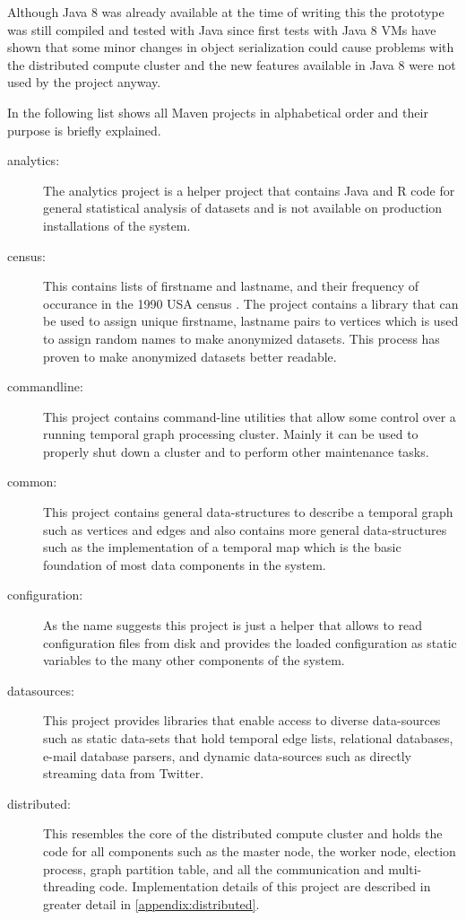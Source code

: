 Although Java 8 was already available at the time of writing this the prototype was still compiled and tested with Java \versionJava{} since first tests with Java 8 VMs have shown that some minor changes in object serialization could cause problems with the distributed compute cluster and the new features available in Java 8 were not used by the project anyway.

In the following list shows all Maven projects in alphabetical order and their purpose is briefly explained.

\begin{description}
\item[analytics:] The analytics project is a helper project that contains Java and R code for general statistical analysis of datasets and is not available on production installations of the system.
\item[census:] This contains lists of firstname and lastname, and their frequency of occurance in the 1990 USA census \cite{GenealogyDataFreq:0EXyVZ6p}. The project contains a library that can be used to assign unique firstname, lastname pairs to vertices which is used to assign random names to make anonymized datasets. This process has proven to make anonymized datasets better readable.
\item[commandline:] This project contains command-line utilities that allow some control over a running temporal graph processing cluster. Mainly it can be used to properly shut down a cluster and to perform other maintenance tasks.
\item[common:] This project contains general data-structures to describe a temporal graph such as vertices and edges and also contains more general data-structures such as the implementation of a temporal map which is the basic foundation of most data components in the system.
\item[configuration:] As the name suggests this project is just a helper that allows to read configuration files from disk and provides the loaded configuration as static variables to the many other components of the system.
\item[datasources:] This project provides libraries that enable access to diverse data-sources such as static data-sets that hold temporal edge lists, relational databases, e-mail database parsers, and dynamic data-sources such as directly streaming data from Twitter.
\item[distributed:] This resembles the core of the distributed compute cluster and holds the code for all components such as the master node, the worker node, election process, graph partition table, and all the communication and multi-threading code. Implementation details of this project are described in greater detail in \ref{appendix:distributed}.

\end{description}
